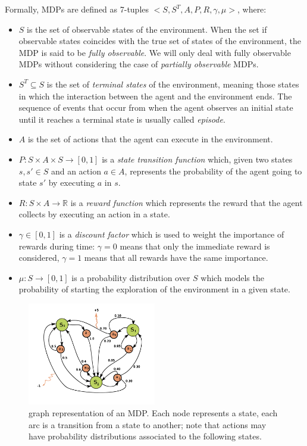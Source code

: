 Formally, MDPs are defined as 7-tuples $<S, S^{T}, A, P, R, \gamma, \mu>$, 
where:
\begin{itemize}
    \item $S$ is the set of observable states of the environment.
    When the set if observable states coincides with the true set of states of the 
    environment, the MDP is said to be \textit{fully observable}. We will only 
    deal with fully observable MDPs without considering the case of 
    \textit{partially observable} MDPs.

    \item $S^{T} \subseteq S$ is the set of \textit{terminal states} of the 
    environment, meaning those states in which the interaction between the agent
    and the environment ends. The sequence of events that occur from when the
    agent observes an initial state until it reaches a terminal state is 
    usually called \textit{episode}.
 
    \item $A$ is the set of actions that the agent can execute in the 
    environment.
 
    \item $P: S \times A \times S \rightarrow [0,1]$ is a \textit{state 
    transition function} which, given two states $s, s' \in S$ and an action 
    $a \in A$, represents the probability of the agent going to state $s'$ by 
    executing $a$ in $s$.
 
    \item $R: S \times A \rightarrow \mathbb{R}$ is a \textit{reward function} 
    which represents the reward that the agent collects by executing an action 
    in a state. 
    
    \item $\gamma \in [0,1]$ is a \textit{discount factor} which is used to 
    weight the importance of rewards during time: $\gamma = 0$ means that only
    the immediate reward is considered, $\gamma = 1$ means that all rewards have
    the same importance.
    
    \item $\mu: S \rightarrow [0, 1]$ is a probability distribution over $S$ 
    which models the probability of starting the exploration of the environment 
    in a given state.
\end{itemize}
%
\begin{figure}[h]
\includegraphics[width=0.5\textwidth]{pictures/mdp}
\centering
\caption{graph representation of an MDP. Each node represents a state, each arc
	 is a transition from a state to another; note that actions may have 
	 probability distributions associated to the following states.}
\end{figure}
%

